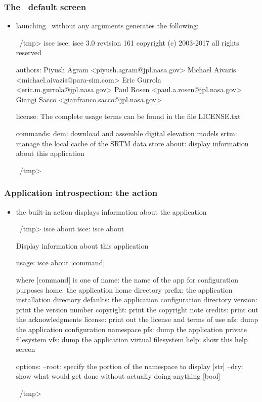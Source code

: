 \begin{frame}[fragile]
%
  \frametitle{The \isce\ default screen}
%
  \begin{itemize}
%
  \item launching \isce\ without any arguments generates the following:
%
    \begin{ish}[gobble=4]{}
      ~/tmp> isce
      isce:
          isce 3.0 revision 161
          copyright (c) 2003-2017 all rights reserved

      authors:
          Piyush Agram        <piyush.agram@jpl.nasa.gov>
          Michael Aivazis     <michael.aivazis@para-sim.com>
          Eric Gurrola        <eric.m.gurrola@jpl.nasa.gov>
          Paul Rosen          <paul.a.rosen@jpl.nasa.gov>
          Giangi Sacco        <gianfranco.sacco@jpl.nasa.gov>

      license:
          The complete usage terms can be found in the file LICENSE.txt

      commands:
            dem: download and assemble digital elevation models
           srtm: manage the local cache of the SRTM data store
          about: display information about this application

      ~/tmp>
    \end{ish}
%
  \end{itemize}
%
\end{frame}

\begin{frame}[fragile]
%
  \frametitle{Application introspection: the action }
%
  \begin{itemize}
%
  \item the built-in action  displays information about the application
%
    \begin{ish}[gobble=4]{}
      ~/tmp> isce about
      isce: isce about

          Display information about this application

      usage:
          isce about [command]

      where [command] is one of
               name: the name of the app for configuration purposes
               home: the application home directory
             prefix: the application installation directory
           defaults: the application configuration directory
            version: print the version number
          copyright: print the copyright note
            credits: print out the acknowledgments
            license: print out the license and terms of use
                nfs: dump the application configuration namespace
                pfs: dump the application private filesystem
                vfs: dump the application virtual filesystem
               help: show this help screen

      options:
          --root: specify the portion of the namespace to display [str]
           --dry: show what would get done without actually doing anything [bool]

      ~/tmp>
    \end{ish}
%
  \end{itemize}
%
\end{frame}

